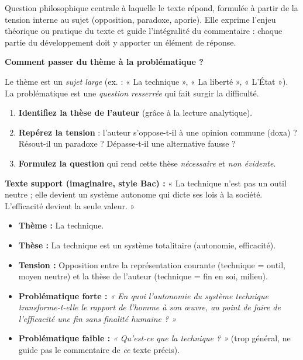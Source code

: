 \documentclass[11pt]{article}
\begin{document}
\begin{definition}[Problématique]
Question philosophique centrale à laquelle le texte répond, formulée à partir de la tension interne au sujet (opposition, paradoxe, aporie). Elle exprime l'enjeu théorique ou pratique du texte et guide l'intégralité du commentaire : chaque partie du développement doit y apporter un élément de réponse.
\end{definition}

\textbf{Comment passer du thème à la problématique ?}\par
Le thème est un \emph{sujet large} (ex. : « La technique », « La liberté », « L'État »). La problématique est une \emph{question resserrée} qui fait surgir la difficulté.
\begin{enumerate}
    \item \textbf{Identifiez la thèse de l'auteur} (grâce à la lecture analytique).
    \item \textbf{Repérez la tension} : l'auteur s'oppose-t-il à une opinion commune (doxa) ? Résout-il un paradoxe ? Dépasse-t-il une alternative fausse ?
    \item \textbf{Formulez la question} qui rend cette thèse \emph{nécessaire} et \emph{non évidente}.
\end{enumerate}

\begin{exemplebox}
\textbf{Texte support (imaginaire, style Bac) :} « La technique n'est pas un outil neutre ; elle devient un système autonome qui dicte ses lois à la société. L'efficacité devient la seule valeur. »
\begin{itemize}
    \item \textbf{Thème :} La technique.
    \item \textbf{Thèse :} La technique est un système totalitaire (autonomie, efficacité).
    \item \textbf{Tension :} Opposition entre la représentation courante (technique = outil, moyen neutre) et la thèse de l'auteur (technique = fin en soi, milieu).
    \item \textbf{Problématique forte :} \emph{« En quoi l'autonomie du système technique transforme-t-elle le rapport de l'homme à son œuvre, au point de faire de l'efficacité une fin sans finalité humaine ? »}
    \item \textbf{Problématique faible :} \emph{« Qu'est-ce que la technique ? »} (trop général, ne guide pas le commentaire de \emph{ce} texte précis).
\end{itemize}
\end{exemplebox}
\end{document}
